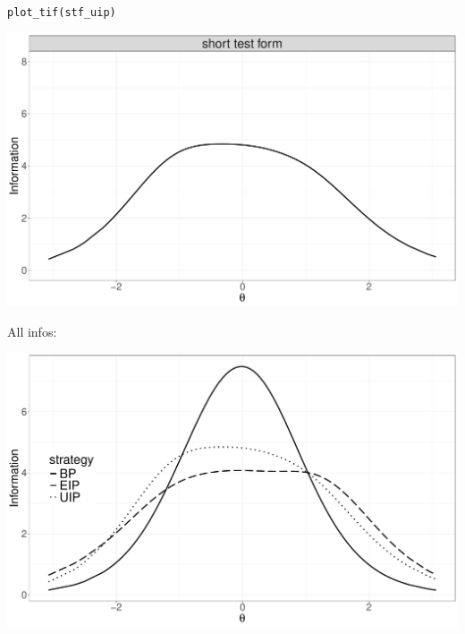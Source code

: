 \documentclass[aspectratio=149, compress]{beamer}
\begin{document}
\begin{frame}[fragile]
\begin{overprint}
	\centering
	
	\texttt{plot\_tif(stf\_uip)}
	
	\includegraphics[width=.90\linewidth]{img/stf-uip}

\centering

All infos:

\includegraphics[width=.90\linewidth]{img/all-infos}

\end{overprint}
		

\end{frame}
\end{document}
